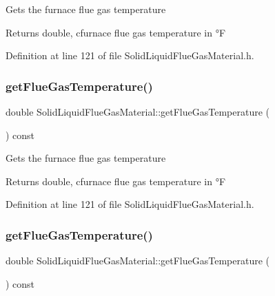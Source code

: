 Gets the furnace flue gas temperature \begin{DoxyReturn}{Returns}
double, cfurnace flue gas temperature in °F 
\end{DoxyReturn}


Definition at line 121 of file Solid\+Liquid\+Flue\+Gas\+Material.\+h.

\mbox{\label{class_solid_liquid_flue_gas_material_aba4604158b3c624496d7de4b5fb511e2}} 
\subsubsection{\texorpdfstring{get\+Flue\+Gas\+Temperature()}{getFlueGasTemperature()}\hspace{0.1cm}{\footnotesize\ttfamily [2/3]}}
{\footnotesize\ttfamily double Solid\+Liquid\+Flue\+Gas\+Material\+::get\+Flue\+Gas\+Temperature (\begin{DoxyParamCaption}{ }\end{DoxyParamCaption}) const\hspace{0.3cm}{\ttfamily [inline]}}

Gets the furnace flue gas temperature \begin{DoxyReturn}{Returns}
double, cfurnace flue gas temperature in °F 
\end{DoxyReturn}


Definition at line 121 of file Solid\+Liquid\+Flue\+Gas\+Material.\+h.

\mbox{\label{class_solid_liquid_flue_gas_material_aba4604158b3c624496d7de4b5fb511e2}} 
\subsubsection{\texorpdfstring{get\+Flue\+Gas\+Temperature()}{getFlueGasTemperature()}\hspace{0.1cm}{\footnotesize\ttfamily [3/3]}}
{\footnotesize\ttfamily double Solid\+Liquid\+Flue\+Gas\+Material\+::get\+Flue\+Gas\+Temperature (\begin{DoxyParamCaption}{ }\end{DoxyParamCaption}) const\hspace{0.3cm}{\ttfamily [inline]}}

